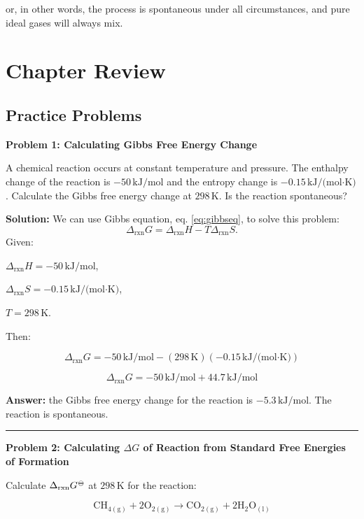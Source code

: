 \documentclass[
  9pt,
]{extbook}
\theoremstyle{definition}
\theoremstyle{definition}
\theoremstyle{definition}
\theoremstyle{remark}
\begin{document}
or, in other words, the process is spontaneous under all circumstances, and pure ideal gases will always mix.

\hypertarget{rev9}{%
\section{Chapter Review}\label{rev9}}

\hypertarget{exer9}{%
\subsection{Practice Problems}\label{exer9}}

\textbf{Problem 1: Calculating Gibbs Free Energy Change}

A chemical reaction occurs at constant temperature and pressure. The enthalpy change of the reaction is \(-50\,\text{kJ/mol}\) and the entropy change is \(-0.15\,\text{kJ/(mol·K)}\). Calculate the Gibbs free energy change at \(298\,\text{K}\). Is the reaction spontaneous?

\textbf{Solution:} We can use Gibbs equation, eq. \eqref{eq:gibbseq}, to solve this problem:
\[\Delta_{\text{rxn}} G= \Delta_{\text{rxn}} H - T\Delta_{\text{rxn}} S.\]
Given:

\(\Delta_{\text{rxn}} H = -50\,\text{kJ/mol}\),

\(\Delta_{\text{rxn}} S = -0.15\,\text{kJ/(mol·K)}\),

\(T=298\,\text{K}\).

Then:

\[\Delta_{\text{rxn}} G = -50\,\text{kJ/mol} - (298\,\text{K})(-0.15\,\text{kJ/(mol·K)})\]

\[\Delta_{\text{rxn}} G = -50\,\text{kJ/mol} + 44.7\,\text{kJ/mol}\]

\textbf{Answer:} the Gibbs free energy change for the reaction is \(-5.3\,\text{kJ/mol}\). The reaction is spontaneous.

\begin{center}\rule{0.5\linewidth}{0.5pt}\end{center}

\textbf{Problem 2: Calculating \(\Delta G\) of Reaction from Standard Free Energies of Formation}

Calculate \(\Delta_{\text{rxn}}G^{{-\kern-6pt{\ominus}\kern-6pt-}}\) at \(298\,\text{K}\) for the reaction:

\[\text{CH}_{4(\text{g})} + 2\text{O}_{2(\text{g})} \rightarrow \text{CO}_{2(\text{g})} + 2\text{H}_{2}\text{O}_{(\text{l})}\]
\end{document}

